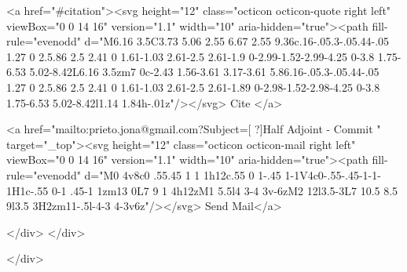       <a  href="#citation"><svg height="12" class="octicon octicon-quote right left" viewBox="0 0 14 16" version="1.1" width="10" aria-hidden="true"><path fill-rule="evenodd" d="M6.16 3.5C3.73 5.06 2.55 6.67 2.55 9.36c.16-.05.3-.05.44-.05 1.27 0 2.5.86 2.5 2.41 0 1.61-1.03 2.61-2.5 2.61-1.9 0-2.99-1.52-2.99-4.25 0-3.8 1.75-6.53 5.02-8.42L6.16 3.5zm7 0c-2.43 1.56-3.61 3.17-3.61 5.86.16-.05.3-.05.44-.05 1.27 0 2.5.86 2.5 2.41 0 1.61-1.03 2.61-2.5 2.61-1.89 0-2.98-1.52-2.98-4.25 0-3.8 1.75-6.53 5.02-8.42l1.14 1.84h-.01z"/></svg> Cite
      </a>

      <a href="mailto:prieto.jona@gmail.com?Subject=[ ?]Half Adjoint - Commit " target="_top"><svg height="12" class="octicon octicon-mail right left" viewBox="0 0 14 16" version="1.1" width="10" aria-hidden="true"><path fill-rule="evenodd" d="M0 4v8c0 .55.45 1 1 1h12c.55 0 1-.45 1-1V4c0-.55-.45-1-1-1H1c-.55 0-1 .45-1 1zm13 0L7 9 1 4h12zM1 5.5l4 3-4 3v-6zM2 12l3.5-3L7 10.5 8.5 9l3.5 3H2zm11-.5l-4-3 4-3v6z"/></svg> Send Mail</a>

    </div>
  </div>

</div>




